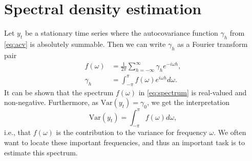 \documentclass[a4paper]{memoir}
\theoremstyle{plain}
\theoremstyle{definition}
\theoremstyle{remark}
\begin{document}
\section{Spectral density estimation}
Let $y_t$ be a stationary time series where the autocovariance function $\gamma_h$ from \eqref{eq:acv} is absolutely summable.
Then we can write $\gamma_h$ as a Fourier transform pair
\begin{align}\label{eq:spectrum}
        f(\omega) &= \frac{1}{2 \pi} \sum_{h = -\infty}^{\infty} \gamma_h e^{-i\omega h}, \\
        \label{eq:spectral_dens_inv}
        \gamma_h &= \int_{-\pi}^{\pi} f(\omega)e^{i\omega h}d\omega.
\end{align}
It can be shown \cite{shumway} that the spectrum $f(\omega)$ in \eqref{eq:spectrum} is real-valued and non-negative.
Furthermore, as $\text{Var}(y_t) = \gamma_0$, we get the interpretation
\begin{equation*}
        \text{Var}(y_t) = \int_{-\pi}^{\pi}f(\omega)d\omega,
\end{equation*}
i.e., that $f(\omega)$ is the contribution to the variance for frequency $\omega$.
We often want to locate these important frequencies,  and thus an important task is to estimate this spectrum.
\end{document}
